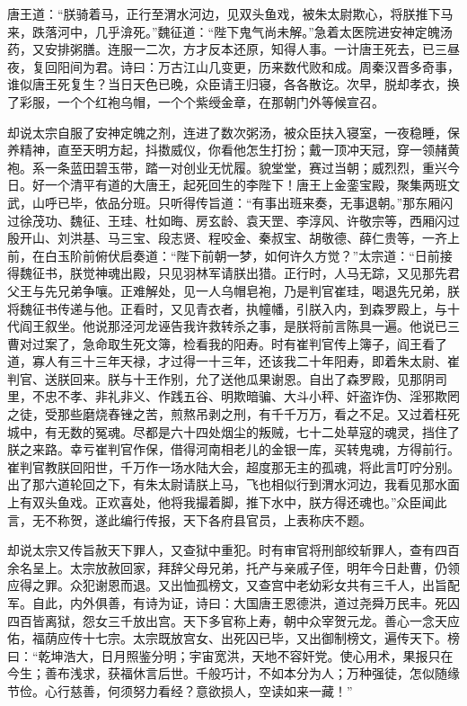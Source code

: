 \documentclass[12pt]{lsbook}
\begin{document}
唐王道：“朕骑着马，正行至渭水河边，见双头鱼戏，被朱太尉欺心，将朕推下马来，跌落河中，几乎渰死。”魏征道：“陛下鬼气尚未解。”急着太医院进安神定魄汤药，又安排粥膳。连服一二次，方才反本还原，知得人事。一计唐王死去，已三昼夜，复回阳间为君。诗曰：万古江山几变更，历来数代败和成。周秦汉晋多奇事，谁似唐王死复生？当日天色已晚，众臣请王归寝，各各散讫。次早，脱却孝衣，换了彩服，一个个红袍乌帽，一个个紫绶金章，在那朝门外等候宣召。

却说太宗自服了安神定魄之剂，连进了数次粥汤，被众臣扶入寝室，一夜稳睡，保养精神，直至天明方起，抖擞威仪，你看他怎生打扮；戴一顶冲天冠，穿一领赭黄袍。系一条蓝田碧玉带，踏一对创业无忧履。貌堂堂，赛过当朝；威烈烈，重兴今日。好一个清平有道的大唐王，起死回生的李陛下！唐王上金銮宝殿，聚集两班文武，山呼已毕，依品分班。只听得传旨道：“有事出班来奏，无事退朝。”那东厢闪过徐茂功、魏征、王珪、杜如晦、房玄龄、袁天罡、李淳风、许敬宗等，西厢闪过殷开山、刘洪基、马三宝、段志贤、程咬金、秦叔宝、胡敬德、薛仁贵等，一齐上前，在白玉阶前俯伏启奏道：“陛下前朝一梦，如何许久方觉？”太宗道：“日前接得魏征书，朕觉神魂出殿，只见羽林军请朕出猎。正行时，人马无踪，又见那先君父王与先兄弟争嚷。正难解处，见一人乌帽皂袍，乃是判官崔珪，喝退先兄弟，朕将魏征书传递与他。正看时，又见青衣者，执幢幡，引朕入内，到森罗殿上，与十代阎王叙坐。他说那泾河龙诬告我许救转杀之事，是朕将前言陈具一遍。他说已三曹对过案了，急命取生死文簿，检看我的阳寿。时有崔判官传上簿子，阎王看了道，寡人有三十三年天禄，才过得一十三年，还该我二十年阳寿，即着朱太尉、崔判官、送朕回来。朕与十王作别，允了送他瓜果谢恩。自出了森罗殿，见那阴司里，不忠不孝、非礼非义、作践五谷、明欺暗骗、大斗小秤、奸盗诈伪、淫邪欺罔之徒，受那些磨烧舂锉之苦，煎熬吊剥之刑，有千千万万，看之不足。又过着枉死城中，有无数的冤魂。尽都是六十四处烟尘的叛贼，七十二处草寇的魂灵，挡住了朕之来路。幸亏崔判官作保，借得河南相老儿的金银一库，买转鬼魂，方得前行。崔判官教朕回阳世，千万作一场水陆大会，超度那无主的孤魂，将此言叮咛分别。出了那六道轮回之下，有朱太尉请朕上马，飞也相似行到渭水河边，我看见那水面上有双头鱼戏。正欢喜处，他将我撮着脚，推下水中，朕方得还魂也。”众臣闻此言，无不称贺，遂此编行传报，天下各府县官员，上表称庆不题。

却说太宗又传旨赦天下罪人，又查狱中重犯。时有审官将刑部绞斩罪人，查有四百余名呈上。太宗放赦回家，拜辞父母兄弟，托产与亲戚子侄，明年今日赴曹，仍领应得之罪。众犯谢恩而退。又出恤孤榜文，又查宫中老幼彩女共有三千人，出旨配军。自此，内外俱善，有诗为证，诗曰：大国唐王恩德洪，道过尧舜万民丰。死囚四百皆离狱，怨女三千放出宫。天下多官称上寿，朝中众宰贺元龙。善心一念天应佑，福荫应传十七宗。太宗既放宫女、出死囚已毕，又出御制榜文，遍传天下。榜曰：“乾坤浩大，日月照鉴分明；宇宙宽洪，天地不容奸党。使心用术，果报只在今生；善布浅求，获福休言后世。千般巧计，不如本分为人；万种强徒，怎似随缘节俭。心行慈善，何须努力看经？意欲损人，空读如来一藏！”
\end{document}
